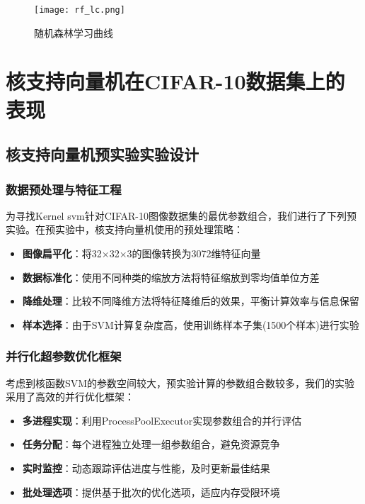 \documentclass[UTF8]{report}
\theoremstyle{MyLineTheoremStyle} %
\theoremstyle{MyBlockTheoremStyle} %
\theoremstyle{MySubsubsectionStyle} %
\begin{document}
\begin{figure}[H]
    \centering
    \texttt{[image: rf\_lc.png]}
    \caption{随机森林学习曲线}
    \label{fig:rf_learning_curve}
\end{figure}





\section{核支持向量机在CIFAR-10数据集上的表现}

\subsection{核支持向量机预实验实验设计}

\subsubsection{数据预处理与特征工程}
为寻找Kernel svm针对CIFAR-10图像数据集的最优参数组合，我们进行了下列预实验。在预实验中，核支持向量机使用的预处理策略：

\begin{itemize}
    \item \textbf{图像扁平化}：将32×32×3的图像转换为3072维特征向量
    \item \textbf{数据标准化}：使用不同种类的缩放方法将特征缩放到零均值单位方差
    \item \textbf{降维处理}：比较不同降维方法将特征降维后的效果，平衡计算效率与信息保留
    \item \textbf{样本选择}：由于SVM计算复杂度高，使用训练样本子集(1500个样本)进行实验
\end{itemize}

\subsubsection{并行化超参数优化框架}
考虑到核函数SVM的参数空间较大，预实验计算的参数组合数较多，我们的实验采用了高效的并行优化框架：

\begin{itemize}
    \item \textbf{多进程实现}：利用ProcessPoolExecutor实现参数组合的并行评估
    \item \textbf{任务分配}：每个进程独立处理一组参数组合，避免资源竞争
    \item \textbf{实时监控}：动态跟踪评估进度与性能，及时更新最佳结果
    \item \textbf{批处理选项}：提供基于批次的优化选项，适应内存受限环境
\end{itemize}
\end{document}
